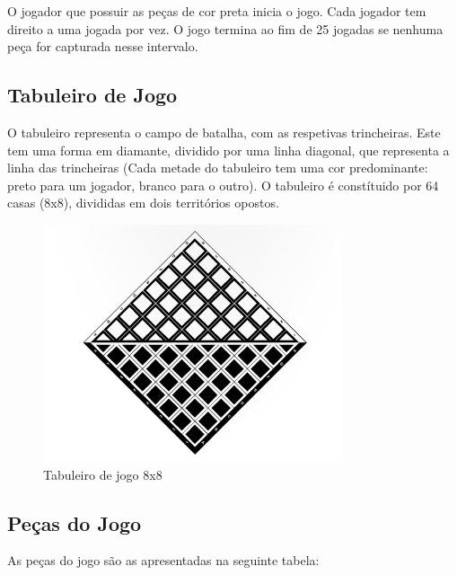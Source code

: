 \documentclass[a4paper]{article}
\begin{document}
O jogador que possuir as peças de cor preta inicia o jogo. Cada jogador tem direito a uma jogada por vez. O jogo termina ao fim de 25 jogadas se nenhuma peça for capturada nesse intervalo.

\newpage

\subsection{Tabuleiro de Jogo}

O tabuleiro representa o campo de batalha, com as respetivas trincheiras.
Este tem uma forma em diamante, dividido por uma linha diagonal, que representa a linha das trincheiras (Cada metade do tabuleiro tem uma cor predominante: preto para um jogador, branco para o outro).
O tabuleiro é constítuido por 64 casas (8x8), divididas em dois territórios opostos.

\begin{figure}[h!]
\begin{center}
\includegraphics[scale=0.5]{img/board.jpg}
\caption{Tabuleiro de jogo 8x8}
\label{fig:1}
\end{center}
\end{figure}


\subsection{Peças do Jogo}

As peças do jogo são as apresentadas na seguinte tabela:
\end{document}
